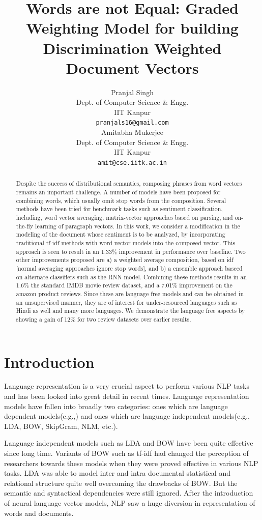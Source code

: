 \documentclass[11pt,a4paper]{article}
\title{Words are not Equal: Graded Weighting Model for building Discrimination Weighted Document Vectors}
\author{Pranjal Singh \\
  Dept. of Computer Science \& Engg. \\
  IIT Kanpur \\
  {\tt pranjals16@gmail.com} \\\And
  Amitabha Mukerjee \\
  Dept. of Computer Science \& Engg. \\
  IIT Kanpur \\
  {\tt amit@cse.iitk.ac.in} \\}
\date{}
\begin{document}
\maketitle
\begin{abstract}
Despite the success of distributional semantics, composing phrases from word vectors remains an important challenge.  A number of models have been proposed for combining words, which usually omit stop words from the composition.  Several methods have been tried for benchmark tasks such as sentiment classification, including, word vector averaging, matrix-vector approaches based on parsing, and on-the-fly learning of paragraph vectors. In this work, we consider a modification in the modeling of the document whose sentiment is to be analyzed, by incorporating traditional tf-idf methods with word vector models into the composed vector.  This approach is seen to result in an 1.33\% improvement in performance over baseline.
Two other improvements proposed are a) a weighted average composition, based on idf [normal averaging approaches ignore stop words], and b) a ensemble approach baseed on alternate classifiers such as the RNN model. Combining these methods results in an 1.6\% the standard IMDB movie review dataset, and a 7.01\% improvement on the amazon product reviews. Since these are language free models and can
be obtained in an unsupervised manner, they are of interest for under-resourced languages such as Hindi as well and many more languages.  We demonstrate the language free aspects by showing a gain of 12\% for two review datasets over earlier results.
\end{abstract}

\section{Introduction}
Language representation is a very crucial aspect to perform various NLP tasks and has been looked into great detail in recent times. Language representation models have fallen into broadly two categories: ones which are language dependent models(e.g.,\cite{Socher:13}) and ones which are language independent models(e.g., LDA, BOW, SkipGram, NLM, etc.). 

Language independent models such as LDA  and BOW have been quite effective since long time. Variants of BOW such as tf-idf had changed the perception of researchers towards these models when they were proved effective in various NLP tasks. LDA was able to model inter and intra documental statistical and relational structure quite well overcoming the drawbacks of BOW. But the semantic and syntactical dependencies were still ignored. After the introduction of neural language vector models, NLP saw a huge diversion in representation of words and documents.
\end{document}
